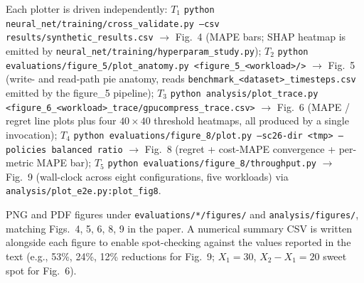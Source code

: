 \documentclass[conference]{IEEEtran}
\begin{document}
Each plotter is driven independently:
$T_1$ \texttt{python neural\_net/training/cross\_validate.py
--csv results/synthetic\_results.csv}
$\rightarrow$ Fig.~4 (MAPE bars; SHAP heatmap is emitted by
\texttt{neural\_net/training/hyperparam\_study.py});
$T_2$ \texttt{python evaluations/figure\_5/plot\_anatomy.py
<figure\_5\_<workload>/>} $\rightarrow$ Fig.~5 (write- and
read-path pie anatomy, reads
\texttt{benchmark\_<dataset>\_timesteps.csv} emitted by the
figure\_5 pipeline);
$T_3$ \texttt{python analysis/plot\_trace.py
<figure\_6\_<workload>\_trace/gpucompress\_trace.csv>}
$\rightarrow$ Fig.~6 (MAPE / regret line plots plus four
$40\times 40$ threshold heatmaps, all produced by a single
invocation);
$T_4$ \texttt{python evaluations/figure\_8/plot.py
--sc26-dir <tmp> --policies balanced ratio}
$\rightarrow$ Fig.~8 (regret + cost-MAPE convergence + per-metric
MAPE bar);
$T_5$ \texttt{python evaluations/figure\_8/throughput.py}
$\rightarrow$ Fig.~9 (wall-clock across eight configurations,
five workloads) via
\texttt{analysis/plot\_e2e.py:plot\_fig8}.

PNG and PDF figures under \texttt{evaluations/*/figures/} and
\texttt{analysis/figures/}, matching Figs.~4, 5, 6, 8, 9 in
the paper. A numerical summary CSV is written alongside each
figure to enable spot-checking against the values reported in
the text (e.g., 53\%, 24\%, 12\% reductions for Fig.~9;
$X_1=30$, $X_2-X_1=20$ sweet spot for Fig.~6).
\end{document}
